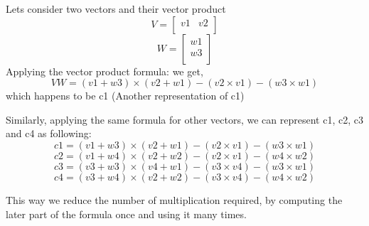 \documentclass[12pt, a4paper]{article}
\begin{document}
Lets consider two vectors and their vector product
 \[
   V=
  \left[ {\begin{array}{cc}
   v1 & v2\\
  \end{array} } \right]
\]
 \[
   W=
  \left[ {\begin{array}{cc}
   w1 \\
   w3 \\
  \end{array} } \right]
\]
Applying the vector product formula: we get,
$$VW = (v1+w3) \times (v2+w1) - (v2 \times v1) - (w3 \times w1)$$which happens to be c1 (Another representation of c1)

Similarly, applying the same formula for other vectors, we can represent c1, c2, c3 and c4 as following: 
$$c1 = (v1+w3) \times (v2+w1) - (v2 \times v1) - (w3 \times w1)$$
$$c2 = (v1+w4) \times (v2+w2) - (v2 \times v1) - (w4 \times w2)$$
$$c3 = (v3+w3) \times (v4+w1) - (v3 \times v4) - (w3 \times w1)$$
$$c4 = (v3+w4) \times (v2+w2) - (v3 \times v4) - (w4 \times w2)$$

This way we reduce the number of multiplication required, by computing the later part of the formula once and using it many times.
\end{document}
